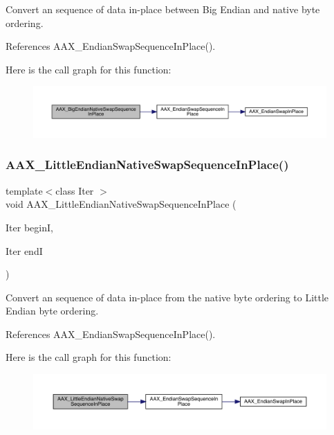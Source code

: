 Convert an sequence of data in-\/place between Big Endian and native byte ordering. 



References A\+A\+X\+\_\+\+Endian\+Swap\+Sequence\+In\+Place().

Here is the call graph for this function\+:
\nopagebreak
\begin{figure}[H]
\begin{center}
\leavevmode
\includegraphics[width=350pt]{a00488_ae9e72785a26249cd3e3c05baf8c9ce70_cgraph}
\end{center}
\end{figure}
\mbox{\label{a00488_a4d8bcdfb048c8124f1f2886537e65678}} 
\subsubsection{\texorpdfstring{AAX\_LittleEndianNativeSwapSequenceInPlace()}{AAX\_LittleEndianNativeSwapSequenceInPlace()}}
{\footnotesize\ttfamily template$<$class Iter $>$ \\
void A\+A\+X\+\_\+\+Little\+Endian\+Native\+Swap\+Sequence\+In\+Place (\begin{DoxyParamCaption}\item[{Iter}]{beginI,  }\item[{Iter}]{endI }\end{DoxyParamCaption})\hspace{0.3cm}{\ttfamily [inline]}}



Convert an sequence of data in-\/place from the native byte ordering to Little Endian byte ordering. 



References A\+A\+X\+\_\+\+Endian\+Swap\+Sequence\+In\+Place().

Here is the call graph for this function\+:
\nopagebreak
\begin{figure}[H]
\begin{center}
\leavevmode
\includegraphics[width=350pt]{a00488_a4d8bcdfb048c8124f1f2886537e65678_cgraph}
\end{center}
\end{figure}
